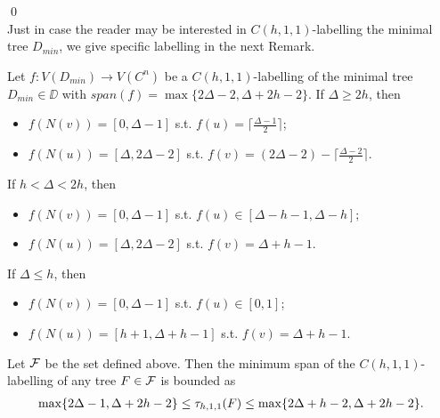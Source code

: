 \qed
\\
Just in case the reader may be interested in $C(h,1,1)$-labelling the minimal tree $D_{min}$, we give specific labelling in the next Remark. 
\begin{remark}
\label{rmk:label}
Let $f:V(D_{min}) \rightarrow V(C^n)$ be a $C(h,1,1)$-labelling of the minimal tree $D_{min} \in \DD$ with $span(f) = \max\{2\Delta-2, \Delta+2h-2\}$. If $\Delta \ge 2h$, then 
\begin{itemize}
\item $f(N(v)) = [0, \Delta-1]$ s.t. $f(u) = \lceil \frac{\Delta-1}{2} \rceil$;
\item $f(N(u)) = [\Delta, 2\Delta-2]$ s.t. $f(v) = (2\Delta - 2) - \lceil \frac{\Delta-2}{2} \rceil$.
\end{itemize}
If $h < \Delta < 2h$, then         
\begin{itemize}
\item $f(N(v)) = [0, \Delta-1]$ s.t. $f(u) \in [\Delta-h-1, \Delta-h]$;
\item $f(N(u)) = [\Delta, 2\Delta-2]$ s.t. $f(v) = \Delta+h-1$.
\end{itemize}
If $\Delta \le h$, then 
\begin{itemize}
\item $f(N(v)) = [0, \Delta-1]$ s.t. $f(u) \in [0, 1]$;  
\item $f(N(u)) = [h+1, \Delta+h-1]$ s.t. $f(v) = \Delta+h-1$.
\end{itemize}
\end{remark}

\begin{theorem}
\label{thm:gencforF}
Let ${\cal F}$ be the set defined above. Then the minimum span of the $C(h,1,1)$-labelling of any tree $F \in {\cal F}$ is bounded as
\begin{align*}
\max\{2\Delta-1, \Delta+2h-2\} \le \tau_{h,1,1}(F) \le \max\{2\Delta+h-2, \Delta+2h-2\}.
\end{align*}
\end{theorem}

